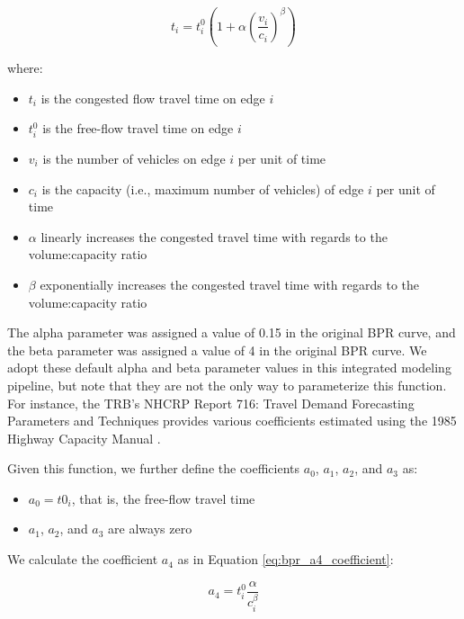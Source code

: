 \begin{equation}
    t_i = t^0_i (1 + \alpha (\frac{v_i}{c_i}) ^ \beta)
    \label{eq:bpr_function}
\end{equation}

where:

\begin{itemize}
    \item $t_i$ is the congested flow travel time on edge $i$
    \item $t^0_i$ is the free-flow travel time on edge $i$
    \item $v_i$ is the number of vehicles on edge $i$ per unit of time 
    \item $c_i$ is the capacity (i.e., maximum number of vehicles) of edge $i$ per unit of time
    \item $\alpha$ linearly increases the congested travel time with regards to the volume:capacity ratio
    \item $\beta$ exponentially increases the congested travel time with regards to the volume:capacity ratio
\end{itemize}

The alpha parameter was assigned a value of 0.15 in the original BPR curve, and the beta parameter was assigned a value of 4 in the original BPR curve. We adopt these default alpha and beta parameter values in this integrated modeling pipeline, but note that they are not the only way to parameterize this function. For instance, the TRB's NHCRP Report 716: Travel Demand Forecasting Parameters and Techniques provides various coefficients estimated using the 1985 Highway Capacity Manual \citep[p.~75]{transportation_research_board_highway_1985,transportation_research_board_travel_2012}.

Given this function, we further define the coefficients $a_0$, $a_1$, $a_2$, and $a_3$ as:
 
\begin{itemize}
    \item $a_0 = t0_i$, that is, the free-flow travel time
    \item $a_1$, $a_2$, and $a_3$ are always zero
\end{itemize}

We calculate the coefficient $a_4$ as in Equation \ref{eq:bpr_a4_coefficient}:

\begin{equation}
    a_4 = t^0_i \frac{\alpha}{c_i ^ {\beta}}
    \label{eq:bpr_a4_coefficient}
\end{equation}

